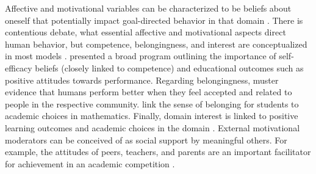 \documentclass[../main/TaylorFrancis/interactapasample]{subfiles}
\begin{document}
Affective and motivational variables can be characterized to be beliefs about oneself that potentially impact goal-directed behavior in that domain \cite{Rheinberg.2012}. There is contentious debate, what essential affective and motivational aspects direct human behavior, but competence, belongingness, and interest are conceptualized in most models \cite{Deci.2000,Hazari.2010}. \cite{Bandura.1997} presented a broad program outlining the importance of self-efficacy beliefs (closely linked to competence) and educational outcomes such as positive attitudes towards performance. Regarding belongingness, \cite{Baumeister.1995} muster evidence that humans perform better when they feel accepted and related to people in the respective community. \cite{Good.2012} link the sense of belonging for students to academic choices in mathematics. Finally, domain interest is linked to positive learning outcomes and academic choices in the domain \cite{Krapp.2002,Hazari.2010}. External motivational moderators can be conceived of as social support by meaningful others. For example, the attitudes of peers, teachers, and parents are an important facilitator for achievement in an academic competition \cite[e.g.,][]{Urhahne.2012}.
\end{document}
